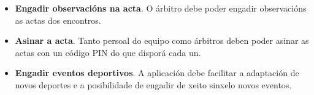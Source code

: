 \begin{itemize}
    \item \textbf{Engadir observacións na acta}.
    O árbitro debe poder engadir observacións as actas dos encontros.

    \item \textbf{Asinar a acta}.
    Tanto persoal do equipo como árbitros deben poder asinar as actas con un 
código PIN do que disporá cada un.

    \item \textbf{Engadir eventos deportivos}.
    A aplicación debe facilitar a adaptación de novos deportes e a posibilidade 
de engadir de xeito sinxelo novos eventos.

    \end{itemize}

